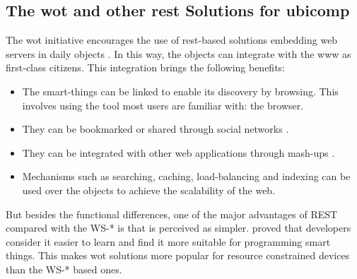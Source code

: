 \subsection{The \acl{wot} and other \ac{rest} Solutions for \acs{ubicomp}}



The \acl{wot} initiative encourages the use of \acs{rest}-based solutions embedding web servers in daily objects \citep{guinard_internet_2011}.
In this way, the objects can integrate with the \ac{www} as first-class citizens. %
This integration brings the following benefits:
\begin{itemize}
  \item The smart-things can be linked to enable its discovery by browsing. This involves using the tool most users are familiar with: the browser.
  \item They can be bookmarked or shared through social networks \citep{guinard_sharing_2010}.
  \item They can be integrated with other web applications through mash-ups \citep{guinard_towards_2009,ostermaier_webplug:_2010,pintus_anatomy_2011}.
  \item Mechanisms such as searching, caching, load-balancing and indexing can be used over the objects to achieve the scalability of the web. %
\end{itemize}


But besides the functional differences, one of the major advantages of REST compared with the WS-* is that is perceived as simpler.
\citet{guinard_search_2011} proved that developers consider it easier to learn and find it more suitable for programming smart things.
This makes \ac{wot} solutions more popular for resource constrained devices than the WS-* based ones.

